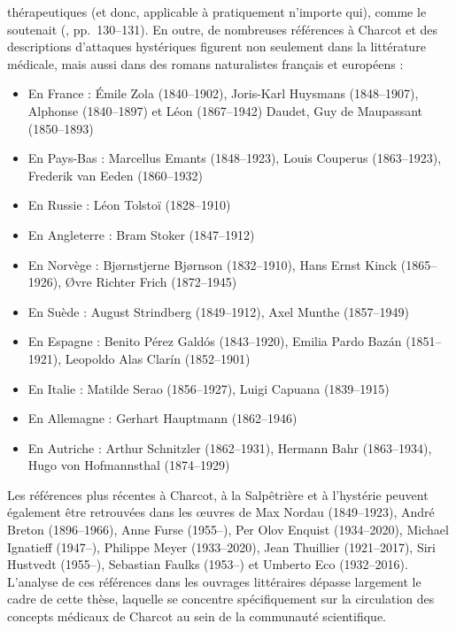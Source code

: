 thérapeutiques (et donc, applicable à pratiquement n'importe qui), comme le soutenait \citeauthor{bernheim1891suggestion} (\citeyear{bernheim1891suggestion}, pp.~130--131). En outre, de nombreuses références à Charcot et des descriptions d'attaques hystériques figurent non seulement dans la littérature médicale, mais aussi dans des romans naturalistes français et européens \citep{KOEHLER201393} :
\begin{itemize}
	\item En France : Émile Zola (1840--1902), Joris-Karl Huysmans (1848--1907), Alphonse (1840--1897) et Léon (1867--1942) Daudet, Guy de Maupassant (1850--1893)
	\item En Pays-Bas : Marcellus Emants (1848--1923), Louis Couperus (1863--1923), Frederik van Eeden (1860--1932)
	\item En Russie : Léon Tolstoï (1828--1910)
	\item En Angleterre : Bram Stoker (1847--1912)
	\item En Norvège : Bj{\o}rnstjerne Bj{\o}rnson (1832--1910), Hans Ernst Kinck (1865--1926), {\O}vre Richter Frich (1872--1945)
	\item En Suède : August Strindberg (1849--1912), Axel Munthe (1857--1949)
	\item En Espagne : Benito Pérez Gald\'{o}s (1843--1920), Emilia Pardo Baz\'{a}n (1851--1921), Leopoldo Alas Clar\'{i}n (1852--1901)
	\item En Italie : Matilde Serao (1856--1927), Luigi Capuana (1839--1915)
	\item En Allemagne : Gerhart Hauptmann (1862--1946)
	\item En Autriche : Arthur Schnitzler (1862--1931), Hermann Bahr (1863--1934), Hugo von Hofmannsthal (1874--1929)
\end{itemize} 

Les références plus récentes à Charcot, à la Salpêtrière et à l'hystérie peuvent également être retrouvées dans les \oe{}uvres de Max Nordau (1849--1923), André Breton (1896--1966), Anne Furse (1955--), Per Olov Enquist (1934--2020), Michael Ignatieff (1947--), Philippe Meyer (1933--2020), Jean Thuillier (1921--2017), Siri Hustvedt (1955--), Sebastian Faulks (1953--) et Umberto Eco (1932--2016). L'analyse de ces références dans les ouvrages littéraires dépasse largement le cadre de cette thèse, laquelle se concentre spécifiquement sur la circulation des concepts médicaux de Charcot au sein de la communauté scientifique.
